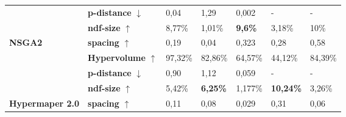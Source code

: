 \begin{table}[]
\begin{tabular}{@{}lllllll@{}}
                                                                                              & \textbf{p-distance} $\downarrow$  & 0,04                                     & 1,29                                     & 0,002                                     & -                                        & -                                        \\
                                                                                              & \textbf{ndf-size} $\uparrow$     & 8,77\%                                   & 1,01\%                                   & \cellcolor[HTML]{EFEFEF}\textbf{9,6\%}    & 3,18\%                                   & 10\%                                     \\
    \multirow{-4}{*}{\textbf{NSGA2}}                                                          & \textbf{spacing} $\uparrow$      & 0,19                                     & 0,04                                     & 0,323                                     & 0,28                                     & 0,58                                     \\ \midrule
                                                                                              & \textbf{Hypervolume} $\uparrow$  & 97,32\%                                  & 82,86\%                                  & 64,57\%                                   & 44,12\%                                  & 84,39\%                                  \\ 
                                                                                              & \textbf{p-distance} $\downarrow$  & 0,90                                     & 1,12                                     & 0,059                                     & -                                        & -                                        \\
                                                                                              & \textbf{ndf-size} $\uparrow$     & 5,42\%                                   & \cellcolor[HTML]{EFEFEF}\textbf{6,25\%}  & 1,177\%                                   & \cellcolor[HTML]{EFEFEF}\textbf{10,24\%} & 3,26\%                                   \\
    \multirow{-4}{*}{\textbf{Hypermaper 2.0}}                                                     & \textbf{spacing} $\uparrow$      & 0,11                                     & 0,08                                     & 0,029                                     & 0,31                                     & 0,06                                     \\ \midrule

\end{tabular}
\end{table}
